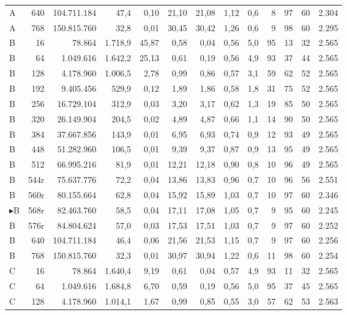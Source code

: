 {\begin{longtable}{l r r r r r r r r r r r r}
A & 640 & 104.711.184 & 47,4 & 0,10 & 21,10 & 21,08 & 1,12 & 0,6 & 8 & 97 & 60 & 2.304 \\
A & 768 & 150.815.760 & 32,8 & 0,01 & 30,45 & 30,42 & 1,26 & 0,6 & 9 & 98 & 60 & 2.295 \\
\midrule
B & 16 & 78.864 & 1.718,9 & 45,87 & 0,58 & 0,04 & 0,56 & 5,0 & 95 & 13 & 32 & 2.565 \\
B & 64 & 1.049.616 & 1.642,2 & 25,13 & 0,61 & 0,19 & 0,56 & 4,9 & 93 & 37 & 44 & 2.565 \\
B & 128 & 4.178.960 & 1.006,5 & 2,78 & 0,99 & 0,86 & 0,57 & 3,1 & 59 & 62 & 52 & 2.565 \\
B & 192 & 9.405.456 & 529,9 & 0,12 & 1,89 & 1,86 & 0,58 & 1,8 & 31 & 75 & 52 & 2.565 \\
B & 256 & 16.729.104 & 312,9 & 0,03 & 3,20 & 3,17 & 0,62 & 1,3 & 19 & 85 & 50 & 2.565 \\
B & 320 & 26.149.904 & 204,5 & 0,02 & 4,89 & 4,87 & 0,66 & 1,1 & 14 & 90 & 50 & 2.565 \\
B & 384 & 37.667.856 & 143,9 & 0,01 & 6,95 & 6,93 & 0,74 & 0,9 & 12 & 93 & 49 & 2.565 \\
B & 448 & 51.282.960 & 106,5 & 0,01 & 9,39 & 9,37 & 0,87 & 0,9 & 13 & 95 & 49 & 2.565 \\
B & 512 & 66.995.216 & 81,9 & 0,01 & 12,21 & 12,18 & 0,90 & 0,8 & 10 & 96 & 49 & 2.565 \\
B & 544r & 75.637.776 & 72,2 & 0,04 & 13,86 & 13,83 & 0,96 & 0,7 & 10 & 96 & 56 & 2.551 \\
B & 560r & 80.155.664 & 62,8 & 0,04 & 15,92 & 15,89 & 1,03 & 0,7 & 10 & 97 & 60 & 2.346 \\
$\blacktriangleright$B & 568r & 82.463.760 & 58,5 & 0,04 & 17,11 & 17,08 & 1,05 & 0,7 & 9 & 95 & 60 & 2.245 \\
B & 576r & 84.804.624 & 57,0 & 0,03 & 17,53 & 17,51 & 1,03 & 0,7 & 9 & 97 & 60 & 2.252 \\
B & 640 & 104.711.184 & 46,4 & 0,06 & 21,56 & 21,53 & 1,15 & 0,7 & 9 & 97 & 60 & 2.256 \\
B & 768 & 150.815.760 & 32,3 & 0,01 & 30,97 & 30,94 & 1,22 & 0,6 & 11 & 98 & 60 & 2.254 \\
\midrule
C & 16 & 78.864 & 1.640,4 & 9,19 & 0,61 & 0,04 & 0,57 & 4,9 & 93 & 11 & 32 & 2.565 \\
C & 64 & 1.049.616 & 1.684,8 & 6,70 & 0,59 & 0,19 & 0,56 & 5,0 & 95 & 37 & 45 & 2.565 \\
C & 128 & 4.178.960 & 1.014,1 & 1,67 & 0,99 & 0,85 & 0,55 & 3,0 & 57 & 62 & 53 & 2.563 \\

\end{longtable}}
